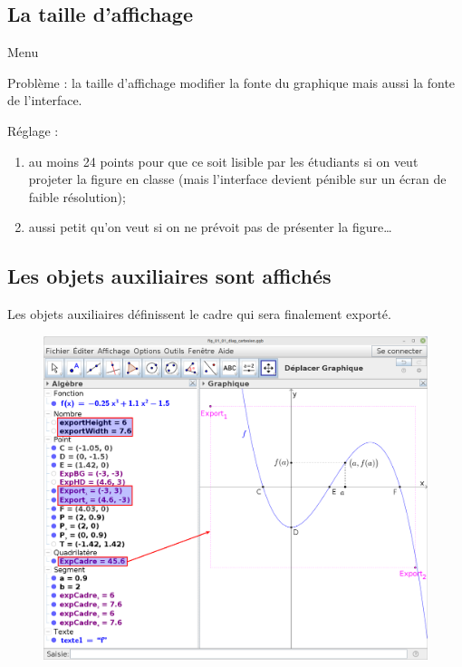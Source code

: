 \documentclass[10pt,a4paper]{report}
\begin{document}
\subsection{La taille d'affichage}

\vspace*{-3ex}
\begin{center}
	\item Menu  \textrightarrow \ 
\end{center}

Problème : la taille d'affichage modifier la fonte du graphique mais aussi la fonte de l'interface.

Réglage :
\begin{enumerate}
	\item au moins 24 points pour que ce soit lisible par les étudiants si on veut projeter la figure en classe (mais l'interface devient pénible sur un écran de faible résolution);
	\item aussi petit qu'on veut si on ne prévoit pas de présenter la figure\dots
\end{enumerate}



\subsection{Les objets auxiliaires sont affichés}

Les objets auxiliaires définissent le cadre  qui sera finalement exporté.

\begin{figure}[H]
	\centering
	\includegraphics[width=.8\linewidth]{captures/interface_geogebra_aux}
	\caption{}
	\label{fig:interface_geogebra_aux}
\end{figure}
\end{document}
